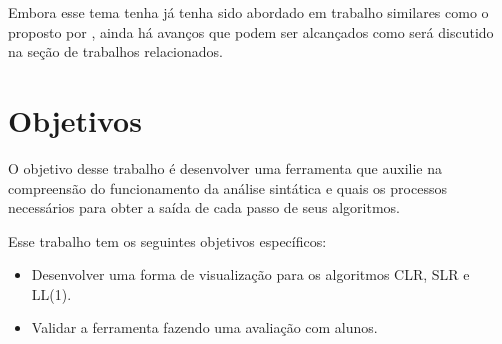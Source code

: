 Embora esse tema tenha já tenha sido abordado em trabalho similares como o proposto por \textcite{pavt}, ainda há avanços que podem ser alcançados como será discutido na seção de trabalhos relacionados.

\section{Objetivos}
O objetivo desse trabalho é desenvolver uma ferramenta que auxilie na compreensão do funcionamento da análise sintática e quais os processos necessários para obter a saída de cada passo de seus algoritmos.

Esse trabalho tem os seguintes objetivos específicos:
\begin{itemize}[label=$\sbullet$]
    \item Desenvolver uma forma de visualização para os algoritmos CLR, SLR e LL(1).
    \item Validar a ferramenta fazendo uma avaliação com alunos.
\end{itemize}

